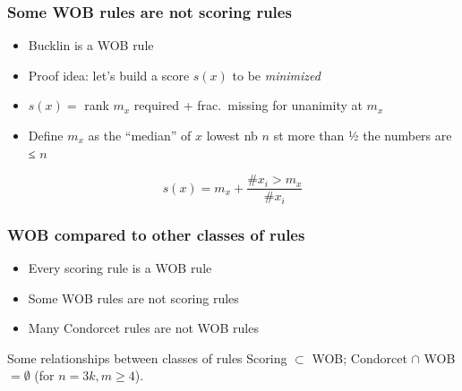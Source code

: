 \documentclass[english]{beamer}
\begin{document}
\begin{frame}[fragile]
	\frametitle{Some WOB rules are not scoring rules}
	\begin{itemize}
		\item Bucklin is a WOB rule
		\item Proof idea: let’s build a score $s(x)$ to be \emph{minimized}
		\item $s(x) = $ rank $m_x$ required + frac.\ missing for unanimity at $m_x$
		\item Define $m_x$ as the “median” of $x$ {\tiny lowest nb $n$ st more than ½ the numbers are ≤ $n$}
	\end{itemize}
	\begin{equation}
		s(x) = m_x + \frac{\# x_i > m_x}{\# x_i}
	\end{equation}
	\begin{example}
		\centering
	\end{example}
\end{frame}

\begin{frame}
	\frametitle{WOB compared to other classes of rules}
	\begin{itemize}
		\item Every scoring rule is a WOB rule
		\item Some WOB rules are not scoring rules
		\item Many Condorcet rules are not WOB rules
	\end{itemize}
	\begin{block}{Some relationships between classes of rules}
		Scoring $\subset$ WOB; Condorcet $\cap$ WOB $= \emptyset$ (for $n = 3k, m ≥ 4$).
	\end{block}
 \end{frame}
\end{document}
